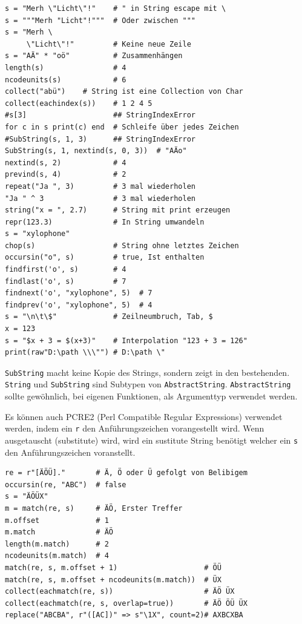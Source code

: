 \documentclass[10pt,twocolumn]{scrartcl}
\begin{document}
\begin{lstlisting}
s = "Merh \"Licht\"!"    # " in String escape mit \
s = """Merh "Licht"!"""  # Oder zwischen """
s = "Merh \
     \"Licht\"!"         # Keine neue Zeile
s = "AÄ" * "oö"          # Zusammenhängen
length(s)                # 4
ncodeunits(s)            # 6
collect("abü")    # String ist eine Collection von Char
collect(eachindex(s))    # 1 2 4 5
#s[3]                    ## StringIndexError
for c in s print(c) end  # Schleife über jedes Zeichen
#SubString(s, 1, 3)      ## StringIndexError
SubString(s, 1, nextind(s, 0, 3))  # "AÄo"
nextind(s, 2)            # 4
prevind(s, 4)            # 2
repeat("Ja ", 3)         # 3 mal wiederholen
"Ja " ^ 3                # 3 mal wiederholen
string("x = ", 2.7)      # String mit print erzeugen
repr(123.3)              # In String umwandeln
s = "xylophone"
chop(s)                  # String ohne letztes Zeichen
occursin("o", s)         # true, Ist enthalten
findfirst('o', s)        # 4
findlast('o', s)         # 7
findnext('o', "xylophone", 5)  # 7
findprev('o', "xylophone", 5)  # 4
s = "\n\t\$"             # Zeilneumbruch, Tab, $
x = 123
s = "$x + 3 = $(x+3)"    # Interpolation "123 + 3 = 126"
print(raw"D:\path \\\"") # D:\path \"
\end{lstlisting}

\lstinline|SubString| macht keine Kopie des Strings, sondern zeigt in den
bestehenden. \lstinline|String| und \lstinline|SubString| sind Subtypen von
\lstinline|AbstractString|. \lstinline|AbstractString| sollte gewöhnlich, bei
eigenen Funktionen, als Argumenttyp verwendet werden.

Es können auch PCRE2 (Perl Compatible Regular Expressions) verwendet werden,
indem ein \lstinline|r| den Anführungszeichen vorangestellt wird. Wenn ausgetauscht (substitute) wird, wird ein sustitute String benötigt welcher ein \lstinline|s| den Anführungszeichen voranstellt.

\begin{lstlisting}
re = r"[ÄÖÜ]."       # Ä, Ö oder Ü gefolgt von Belibigem
occursin(re, "ABC")  # false
s = "ÄÖÜX"
m = match(re, s)     # ÄÖ, Erster Treffer
m.offset             # 1
m.match              # ÄÖ
length(m.match)      # 2
ncodeunits(m.match)  # 4
match(re, s, m.offset + 1)                    # ÖÜ
match(re, s, m.offset + ncodeunits(m.match))  # ÜX
collect(eachmatch(re, s))                     # ÄÖ ÜX
collect(eachmatch(re, s, overlap=true))       # ÄÖ ÖÜ ÜX
replace("ABCBA", r"([AC])" => s"\1X", count=2)# AXBCXBA
\end{lstlisting}
\end{document}
